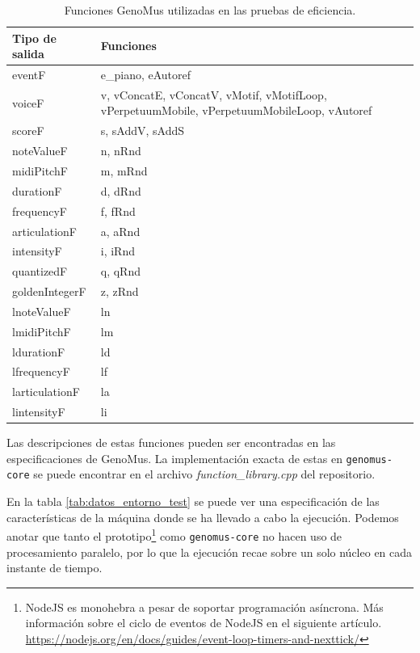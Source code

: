 \begin{table}[]
    \centering
    \begin{tabular}{p{4cm} p{5cm}}
        Tipo de salida & Funciones \\ \hline \hline
        eventF & e\_piano, eAutoref \\ \hline
        voiceF & v, vConcatE, vConcatV, vMotif, vMotifLoop, vPerpetuumMobile, vPerpetuumMobileLoop, vAutoref \\ \hline
        scoreF & s, sAddV, sAddS \\ \hline
        noteValueF & n, nRnd \\ \hline
        midiPitchF & m, mRnd \\ \hline
        durationF & d, dRnd \\ \hline
        frequencyF & f, fRnd \\ \hline
        articulationF & a, aRnd \\ \hline
        intensityF & i, iRnd \\ \hline
        quantizedF & q, qRnd \\ \hline
        goldenIntegerF & z, zRnd \\ \hline
        lnoteValueF & ln \\ \hline
        lmidiPitchF & lm \\ \hline
        ldurationF & ld \\ \hline
        lfrequencyF & lf \\ \hline
        larticulationF & la \\ \hline
        lintensityF & li \\ \hline
    \end{tabular}
    \caption{Funciones GenoMus utilizadas en las pruebas de eficiencia.} Las descripciones de estas funciones pueden ser encontradas en las especificaciones de GenoMus\cite{GenoMus}. La implementación exacta de estas en \verb|genomus-core| se puede encontrar en el archivo \textit{function\_library.cpp} del repositorio.
    \label{tab:used_functions}
\end{table}

En la tabla \ref{tab:datos_entorno_test} se puede ver una especificación de las características de la máquina donde se ha llevado a cabo la ejecución. Podemos anotar que tanto el prototipo\footnote{
    NodeJS es monohebra a pesar de soportar programación asíncrona. Más información sobre el ciclo de eventos de NodeJS en el siguiente artículo. \url{https://nodejs.org/en/docs/guides/event-loop-timers-and-nexttick/}
} como \verb|genomus-core| no hacen uso de procesamiento paralelo, por lo que la ejecución recae sobre un solo núcleo en cada instante de tiempo.

